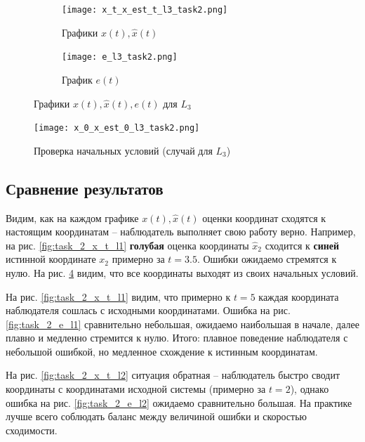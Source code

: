 \documentclass[a4paper, 12pt]{article}
\begin{document}
    \begin{figure}[H]
        \centering
        \begin{subfigure}{0.45\textwidth}
            \centering
            \texttt{[image: x\_t\_x\_est\_t\_l3\_task2.png]}
            \caption{Графики $x(t),\hat{x}(t)$}
            \label{fig:task_2_x_t_l3}
        \end{subfigure}
        \hfill
        \begin{subfigure}{0.45\textwidth}
            \centering
            \texttt{[image: e\_l3\_task2.png]}
            \caption{График $e(t)$}
            \label{fig:task_2_e_l3}
        \end{subfigure}
        \caption{Графики $x(t),\hat{x}(t),e(t)$ для $L_3$}
        \label{fig:task_2_modeling_3}
    \end{figure}
    \begin{figure}[H]
        \centering
        \texttt{[image: x\_0\_x\_est\_0\_l3\_task2.png]}
        \captionsetup{skip=0pt}
        \caption{Проверка начальных условий (случай для $L_3$)}
        \label{fig:x_0_check}
    \end{figure}


    \subsection{Сравнение результатов}
    Видим, как на каждом графике $x(t),\hat{x}(t)$ оценки координат сходятся к настоящим координатам -- наблюдатель
    выполняет свою работу верно. Например, на рис. \ref{fig:task_2_x_t_l1} \textbf{голубая} оценка координаты $\hat{x}_2$ сходится
    к \textbf{синей} истинной координате $x_2$ примерно за $t=3.5$. Ошибки ожидаемо стремятся к нулю. На рис. \ref{fig:x_0_check}
    видим, что все координаты выходят из своих начальных условий.


    На рис. \ref{fig:task_2_x_t_l1} видим, что примерно к $t=5$ каждая координата наблюдателя сошлась с исходными координатами.
    Ошибка на рис. \ref{fig:task_2_e_l1} сравнительно небольшая, ожидаемо наибольшая в начале, далее плавно и медленно стремится к нулю.
    Итого: плавное поведение наблюдателя с небольшой ошибкой, но медленное схождение к истинным координатам.


    На рис. \ref{fig:task_2_x_t_l2} ситуация обратная -- наблюдатель быстро сводит координаты с координатами
    исходной системы (примерно за $t=2$), однако ошибка на рис. \ref{fig:task_2_e_l2} ожидаемо сравнительно большая. На практике лучше всего
    соблюдать баланс между величиной ошибки и скоростью сходимости.
\end{document}
